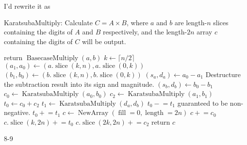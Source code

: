 \documentclass{computer-arithmetic}
\begin{document}
I'd rewrite it as

\begin{algorithm}
  \caption{KaratsubaMultiply: Calculate \(C = A × B\), where \(a\) and
    \(b\) are length-\(n\) slices containing the digits of \(A\) and
    \(B\) respectively, and the length-\(2n\) array \(c\) containing
    the digits of \(C\) will be output.}
\begin{algorithmic}[1]
    \State return $\operatorname{BasecaseMultiply}(a, b)$
\EndIf
\State $k ← \lceil n / 2 \rceil$
\State \((a_1, a_0) ← (a.\operatorname{slice}(k, n), a.\operatorname{slice}(0, k))\)
\State \((b_1, b_0) ← (b.\operatorname{slice}(k, n), b.\operatorname{slice}(0, k))\)
\State \((s_a, d_a) ← a_0 - a_1\)
\Comment Destructure the subtraction result into its sign and magnitude.
\State \((s_b, d_b) ← b_0 - b_1\)
\State \(c_0 ← \operatorname{KaratsubaMultiply}(a_0, b_0)\)
\State \(c_2 ← \operatorname{KaratsubaMultiply}(a_1, b_1)\)
\State \(t_0 ← c_0 + c_2\)
\State \(t_1 ← \operatorname{KaratsubaMultiply}(d_a, d_b)\)
\State \(t_0 \mathrel{-}= t_1\)
\Comment guaranteed to be non-negative.
\Else
\State \(t_0 \mathrel{+}= t_1\)
\EndIf
\State \(c ← \operatorname{NewArray}(\operatorname{fill}=0, \operatorname{length}=2n)\)
\State \(c \mathrel{+}= c_0\)
\State \(c.\operatorname{slice}(k, 2n) \mathrel{+}= t_0\)
\State \(c.\operatorname{slice}(2k, 2n) \mathrel{+}= c_2\)
\State return \(c\)
\end{algorithmic}
\end{algorithm}

\begin{problem}{8-9}
\end{problem}

\begin{solution}
\end{solution}
\end{document}
